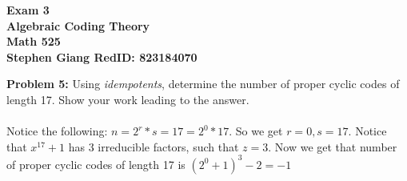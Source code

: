 \documentclass[11pt]{article}
\newcommand{\skipline}{\vspace{\baselineskip}}
\newenvironment{problem}[1]{\textbf{Problem #1: }}{\newpage}
\begin{document}
	
	\begin{center}
		\textbf{Exam 3} \\
		\textbf{Algebraic Coding Theory} \\
		\textbf{Math 525} \\
		\textbf{Stephen Giang RedID: 823184070} \\
		\skipline \skipline
	\end{center}

	\begin{problem}{5}
		Using \textit{idempotents}, determine the number of proper cyclic codes of length 17. Show your work leading to the answer.
		\\ \\
		Notice the following: $n = 2^r * s = 17 = 2^0 * 17$. So we get $r = 0, s = 17$.  Notice that $x^{17} + 1$ has 3 irreducible factors, such that $z = 3$.  Now we get that number of proper cyclic codes of length 17 is $(2^0 + 1)^3 - 2 = -1$
		\\ \\
		
	\end{problem}
\end{document}

